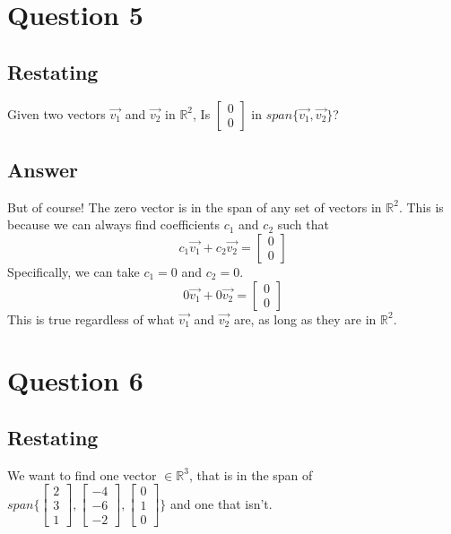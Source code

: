 \documentclass{article}
\begin{document}
    \section{Question 5}
        \subsection{Restating}
            Given two vectors $\vec{v_1}$ and $\vec{v_2}$ in $\mathbb{R}^2$,
            Is $\begin{bmatrix}0 \\ 0\end{bmatrix}$ in $span\{\vec{v_1}, \vec{v_2}\}$?
        \subsection{Answer}
            But of course! The zero vector is in the span of any set of vectors in $\mathbb{R}^2$.
            This is because we can always find coefficients $c_1$ and $c_2$ such that
            \[c_1\vec{v_1} + c_2\vec{v_2} = \begin{bmatrix}0 \\ 0\end{bmatrix}\]
            Specifically, we can take $c_1 = 0$ and $c_2 = 0$.
            \[0\vec{v_1} + 0\vec{v_2} = \begin{bmatrix}0 \\ 0\end{bmatrix}\]
            This is true regardless of what $\vec{v_1}$ and $\vec{v_2}$ are, as long as they are in $\mathbb{R}^2$.




    \section{Question 6}
        \subsection{Restating}
            We want to find one vector $\in \mathbb{R}^3$, that is in the span of
            $span\{\begin{bmatrix}2 \\ 3 \\ 1\end{bmatrix}, \begin{bmatrix}-4 \\ -6 \\ -2\end{bmatrix}, \begin{bmatrix}0 \\ 1 \\ 0\end{bmatrix}\}$
            and one that isn't.
\end{document}

